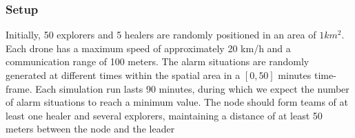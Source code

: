 \subsubsection{Setup}
Initially, 50 explorers and 5 healers are randomly positioned in an area of $1 km^2$. 
 Each drone has a maximum speed of approximately 20 km/h and a communication range of 100 meters.
%
The alarm situations are randomly generated at different times %
 within the spatial area in a $[0,50]$ minutes time-frame. 
%
%
Each simulation run lasts 90 minutes, 
 during which we expect the number of alarm situations to reach a minimum value.
The node should form teams of at least one healer and several explorers, maintaining a distance of at least 50 meters between the node and the leader

